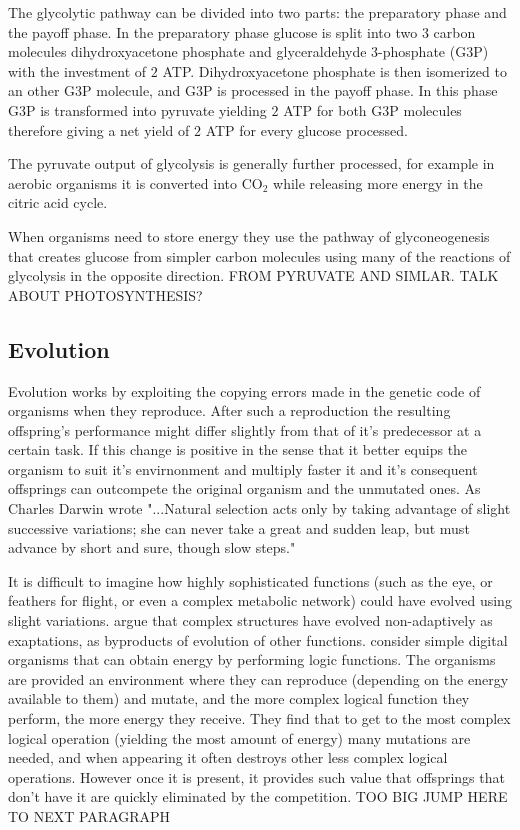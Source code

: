 \documentclass[10pt,a4paper]{article}
\begin{document}
The glycolytic pathway can be divided into two parts: the preparatory phase and the payoff phase. In the preparatory phase glucose is split into two $3$ carbon molecules dihydroxyacetone phosphate and glyceraldehyde 3-phosphate (G3P) with the investment of $2$ ATP. Dihydroxyacetone phosphate is then isomerized to an other G3P molecule, and G3P is processed in the payoff phase. In this phase G3P is transformed into pyruvate yielding $2$ ATP for both G3P molecules therefore giving a net yield of $2$ ATP for every glucose processed. 

The pyruvate output of glycolysis is generally further processed, for example in aerobic organisms it is converted into CO$_2$ while releasing more energy in the citric acid cycle. 

When organisms need to store energy they use the pathway of glyconeogenesis that creates glucose from simpler carbon molecules using many of the reactions of glycolysis in the opposite direction. FROM PYRUVATE AND SIMLAR. TALK ABOUT PHOTOSYNTHESIS?
	
	\subsection{Evolution}\label{chap:evolution}
	
	Evolution works by exploiting the copying errors made in the genetic code of organisms when they reproduce. After such a reproduction the resulting offspring's performance might differ slightly from that of it's predecessor at a certain task. If this change is positive in the sense that it better equips the organism to suit it's envirnonment and multiply faster it and it's consequent offsprings can outcompete the original organism and the unmutated ones.  As Charles Darwin wrote "...Natural selection acts only by taking advantage of slight successive variations; she can never take a great and sudden leap, but must advance by short and sure, though slow steps." \cite{darwin} 
	
	It is difficult to imagine how highly sophisticated functions (such as the eye, or feathers for flight, or even a complex metabolic network) could have evolved using slight variations. \cite{latent} argue that complex structures have evolved non-adaptively as exaptations, as byproducts of evolution of other functions. \cite{complexfeatures}  consider simple digital organisms that can obtain energy by performing logic functions. The organisms are provided an environment where they can reproduce (depending on the energy available to them) and mutate, and the more complex logical function they perform, the more energy they receive. They find that to get to the most complex logical operation (yielding the most amount of energy) many mutations are needed, and when appearing it often destroys other less complex logical operations. However once it is present, it provides such value that offsprings that don't have it are quickly eliminated by the competition. TOO BIG JUMP HERE TO NEXT PARAGRAPH
	
\end{document}
